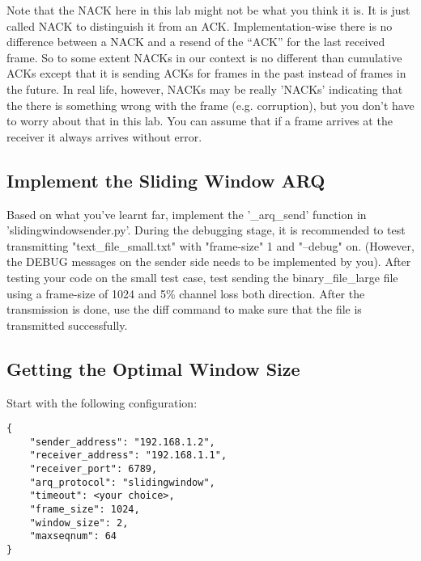 \documentclass[11pt]{article}
\begin{document}
\noindent Note that the NACK here in this lab might not be what you think it is. It is just called NACK to distinguish it from an ACK. Implementation-wise there is no difference between a NACK and a resend
of the ``ACK'' for the last received frame. So to some extent NACKs in our context is no different than cumulative ACKs except that it is sending ACKs for frames in the past instead of frames in the future.
In real life, however, NACKs may be really 'NACKs' indicating that the there is something wrong with the frame (e.g. corruption), but you don't have to worry about that in this lab. You can assume that
if a  frame arrives at the receiver it always arrives without error.


\subsection{Implement the Sliding Window ARQ}
Based on what you've learnt far, implement the '\_arq\_send' function in 'slidingwindowsender.py'. During the debugging stage, it is recommended to test transmitting "text\_file\_small.txt" with "frame-size" 1 and "--debug" on. (However, the DEBUG messages on the sender side needs to be implemented by you). After testing your code on the small test case, test sending the binary\_file\_large file using a frame-size of 1024 and 5\% channel loss both direction. After the transmission is done, use the diff command to make sure that the file is transmitted successfully.



\subsection{Getting the Optimal Window Size}

Start with the following configuration:
\begin{lstlisting}[caption={Sliding Window Configuration}]
{
    "sender_address": "192.168.1.2",
    "receiver_address": "192.168.1.1",
    "receiver_port": 6789,
    "arq_protocol": "slidingwindow",
    "timeout": <your choice>,
    "frame_size": 1024,
    "window_size": 2,
    "maxseqnum": 64
}
\end{lstlisting}
\end{document}
